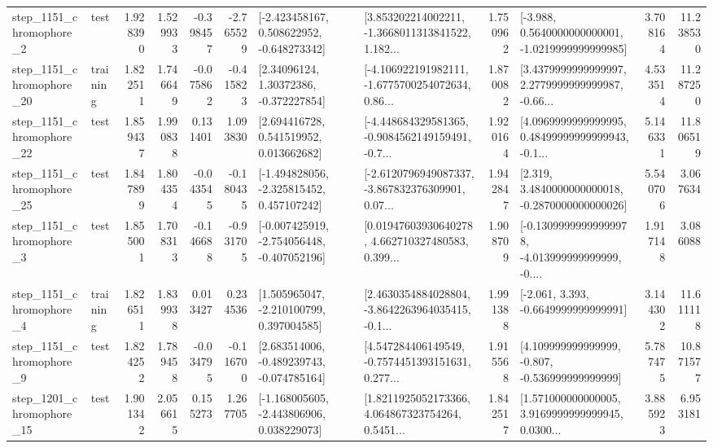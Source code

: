 \begin{tabular}{llrrrrllrlrr}
  step\_1151\_chromophore\_2 &      test &      1.928390 &    1.529933 &     -0.398457 & -2.765529 &   [-2.423458167, 0.508622952, -0.648273342] &  [3.853202214002211, -1.3668011313841522, 1.182... &       1.750962 &  [-3.988, 0.5640000000000001, -1.0219999999999985] &            3.708164 &         11.238530 \\
 step\_1151\_chromophore\_20 &  training &      1.822511 &    1.746649 &     -0.075862 & -0.415823 &      [2.34096124, 1.30372386, -0.372227854] &  [-4.106922191982111, -1.6775700254072634, 0.86... &       1.870082 &  [3.4379999999999997, 2.2779999999999987, -0.66... &            4.533514 &         11.287250 \\
 step\_1151\_chromophore\_22 &      test &      1.859437 &    1.990838 &      0.131401 &  1.093830 &     [2.694416728, 0.541519952, 0.013662682] &  [-4.448684329581365, -0.9084562149159491, -0.7... &       1.920164 &  [4.0969999999999995, 0.48499999999999943, -0.1... &            5.146331 &         11.806519 \\
 step\_1151\_chromophore\_25 &      test &      1.847899 &    1.804354 &     -0.043545 & -0.180435 &   [-1.494828056, -2.325815452, 0.457107242] &  [-2.6120796949087337, -3.867832376309901, 0.07... &       1.942847 &   [2.319, 3.4840000000000018, -0.2870000000000026] &            5.540706 &          3.067634 \\
  step\_1151\_chromophore\_3 &      test &      1.855001 &    1.708313 &     -0.146688 & -0.931705 &  [-0.007425919, -2.754056448, -0.407052196] &  [0.01947603930640278, 4.662710327480583, 0.399... &       1.908709 &  [-0.13099999999999978, -4.013999999999999, -0.... &            1.917148 &          3.086088 \\
  step\_1151\_chromophore\_4 &  training &      1.826511 &    1.839938 &      0.013427 &  0.234536 &    [1.505965047, -2.210100799, 0.397004585] &  [2.4630354884028804, -3.8642263964035415, -0.1... &       1.991388 &               [-2.061, 3.393, -0.6649999999999991] &            3.144302 &         11.611118 \\
  step\_1151\_chromophore\_9 &      test &      1.824252 &    1.789458 &     -0.034795 & -0.116700 &   [2.683514006, -0.489239743, -0.074785164] &  [4.547284406149549, -0.7574451393151631, 0.277... &       1.915568 &    [4.109999999999999, -0.807, -0.536999999999999] &            5.787475 &         10.871577 \\
 step\_1201\_chromophore\_15 &      test &      1.901342 &    2.056615 &      0.155273 &  1.267705 &   [-1.168005605, -2.443806906, 0.038229073] &  [1.8211925052173366, 4.064867323754264, 0.5451... &       1.842517 &  [1.571000000000005, 3.9169999999999945, 0.0300... &            3.885923 &          6.953181 \\

\end{tabular}
